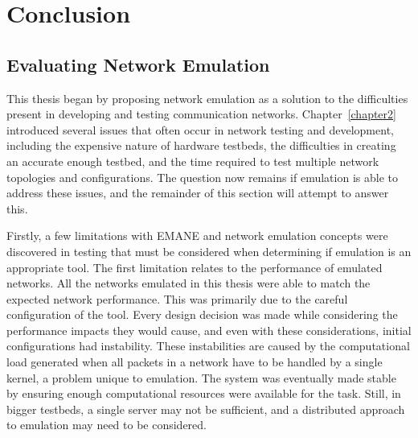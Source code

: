 \chapter{Conclusion}
\label{conclusion}
\section{Evaluating Network Emulation}
This thesis began by proposing network emulation as a solution to the difficulties present in developing and testing communication networks.
Chapter~\ref{chapter2} introduced several issues that often occur in network testing and development, including the expensive nature of hardware testbeds, the difficulties in creating an accurate enough testbed, and the time required to test multiple network topologies and configurations.
The question now remains if emulation is able to address these issues, and the remainder of this section will attempt to answer this.\par
Firstly, a few limitations with EMANE and network emulation concepts were discovered in testing that must be considered when determining if emulation is an appropriate tool.
The first limitation relates to the performance of emulated networks.
All the networks emulated in this thesis were able to match the expected network performance. This was primarily due to the careful configuration of the tool.
Every design decision was made while considering the performance impacts they would cause, and even with these considerations, initial configurations had instability.
These instabilities are caused by the computational load generated when all packets in a network have to be handled by a single kernel, a problem unique to emulation.
The system was eventually made stable by ensuring enough computational resources were available for the task.
Still, in bigger testbeds, a single server may not be sufficient, and a distributed approach to emulation may need to be considered.
